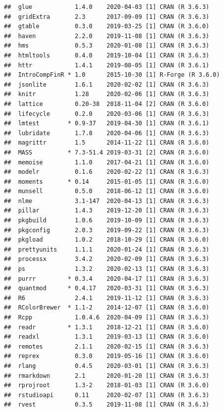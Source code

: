 \documentclass[
  a4paper,
  oneside]{memoir}
\begin{document}
\begin{verbatim}
##  glue            1.4.0    2020-04-03 [1] CRAN (R 3.6.3)   
##  gridExtra       2.3      2017-09-09 [1] CRAN (R 3.6.3)   
##  gtable          0.3.0    2019-03-25 [1] CRAN (R 3.6.0)   
##  haven           2.2.0    2019-11-08 [1] CRAN (R 3.6.3)   
##  hms             0.5.3    2020-01-08 [1] CRAN (R 3.6.3)   
##  htmltools       0.4.0    2019-10-04 [1] CRAN (R 3.6.3)   
##  httr            1.4.1    2019-08-05 [1] CRAN (R 3.6.1)   
##  IntroCompFinR * 1.0      2015-10-30 [1] R-Forge (R 3.6.0)
##  jsonlite        1.6.1    2020-02-02 [1] CRAN (R 3.6.3)   
##  knitr           1.28     2020-02-06 [1] CRAN (R 3.6.3)   
##  lattice         0.20-38  2018-11-04 [2] CRAN (R 3.6.0)   
##  lifecycle       0.2.0    2020-03-06 [1] CRAN (R 3.6.3)   
##  lmtest        * 0.9-37   2019-04-30 [1] CRAN (R 3.6.1)   
##  lubridate       1.7.8    2020-04-06 [1] CRAN (R 3.6.3)   
##  magrittr        1.5      2014-11-22 [1] CRAN (R 3.6.0)   
##  MASS          * 7.3-51.4 2019-03-31 [2] CRAN (R 3.6.0)   
##  memoise         1.1.0    2017-04-21 [1] CRAN (R 3.6.0)   
##  modelr          0.1.6    2020-02-22 [1] CRAN (R 3.6.3)   
##  moments       * 0.14     2015-01-05 [1] CRAN (R 3.6.0)   
##  munsell         0.5.0    2018-06-12 [1] CRAN (R 3.6.0)   
##  nlme            3.1-147  2020-04-13 [1] CRAN (R 3.6.3)   
##  pillar          1.4.3    2019-12-20 [1] CRAN (R 3.6.3)   
##  pkgbuild        1.0.6    2019-10-09 [1] CRAN (R 3.6.3)   
##  pkgconfig       2.0.3    2019-09-22 [1] CRAN (R 3.6.3)   
##  pkgload         1.0.2    2018-10-29 [1] CRAN (R 3.6.0)   
##  prettyunits     1.1.1    2020-01-24 [1] CRAN (R 3.6.3)   
##  processx        3.4.2    2020-02-09 [1] CRAN (R 3.6.3)   
##  ps              1.3.2    2020-02-13 [1] CRAN (R 3.6.3)   
##  purrr         * 0.3.4    2020-04-17 [1] CRAN (R 3.6.3)   
##  quantmod      * 0.4.17   2020-03-31 [1] CRAN (R 3.6.3)   
##  R6              2.4.1    2019-11-12 [1] CRAN (R 3.6.3)   
##  RColorBrewer  * 1.1-2    2014-12-07 [1] CRAN (R 3.6.0)   
##  Rcpp            1.0.4.6  2020-04-09 [1] CRAN (R 3.6.3)   
##  readr         * 1.3.1    2018-12-21 [1] CRAN (R 3.6.0)   
##  readxl          1.3.1    2019-03-13 [1] CRAN (R 3.6.0)   
##  remotes         2.1.1    2020-02-15 [1] CRAN (R 3.6.3)   
##  reprex          0.3.0    2019-05-16 [1] CRAN (R 3.6.0)   
##  rlang           0.4.5    2020-03-01 [1] CRAN (R 3.6.3)   
##  rmarkdown       2.1      2020-01-20 [1] CRAN (R 3.6.3)   
##  rprojroot       1.3-2    2018-01-03 [1] CRAN (R 3.6.0)   
##  rstudioapi      0.11     2020-02-07 [1] CRAN (R 3.6.3)   
##  rvest           0.3.5    2019-11-08 [1] CRAN (R 3.6.3)   

\end{verbatim}
\end{document}
